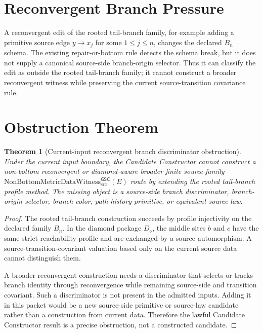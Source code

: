\documentclass[11pt]{article}
\newcommand{\Witness}{\mathrm{NonBottomMetricDataWitness}_{\mathrm{src}}^{\mathsf{GSC}}}
\newcommand{\Bn}{B_n}
\newcommand{\Diamond}{D_{\diamond}}
\newtheorem{theorem}{Theorem}
\begin{document}
\section{Reconvergent Branch Pressure}

A reconvergent edit of the rooted tail-branch family, for example adding a
primitive source edge \(y\to x_j\) for some \(1\le j\le n\), changes the
declared \(\Bn\) schema. The existing repair-or-bottom rule detects the schema
break, but it does not supply a canonical source-side branch-origin selector.
Thus it can classify the edit as outside the rooted tail-branch family; it
cannot construct a broader reconvergent witness while preserving the current
source-transition covariance rule.

\section{Obstruction Theorem}

\begin{theorem}[Current-input reconvergent branch discriminator obstruction]
Under the current input boundary, the Candidate Constructor cannot construct a
non-bottom reconvergent or diamond-aware broader finite source-family
\(\Witness(E)\) route by extending the rooted tail-branch profile method.
The missing object is a source-side branch discriminator, branch-origin
selector, branch color, path-history primitive, or equivalent source law.
\end{theorem}

\begin{proof}
The rooted tail-branch construction succeeds by profile injectivity on the
declared family \(\Bn\). In the diamond package \(\Diamond\), the middle sites
\(b\) and \(c\) have the same strict reachability profile and are exchanged by
a source automorphism. A source-transition-covariant valuation based only on
the current source data cannot distinguish them.

A broader reconvergent construction needs a discriminator that selects or
tracks branch identity through reconvergence while remaining source-side and
transition covariant. Such a discriminator is not present in the admitted
inputs. Adding it in this packet would be a new source-side primitive or
source-law candidate rather than a construction from current data. Therefore
the lawful Candidate Constructor result is a precise obstruction, not a
constructed candidate.
\end{proof}
\end{document}
